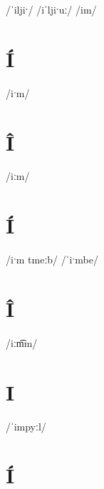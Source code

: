 \documentclass[10pt,a4paper,twoside]{book}
\begin{document}
\begin{multicols}{3}
 {/ˈiljiˑ/} {}
 {/iˈljiˑuː/} {}
 {/im/} {}
\end{multicols}

\section*{Í}

\begin{multicols}{3}
 {/iˑm/} {}
\end{multicols}

\section*{Î}

\begin{multicols}{3}
 {/iːm/} {}
\end{multicols}

\section*{Í}

\begin{multicols}{3}
 {/iˑm tmeːb/} {}
 {/ˈiˑmbe/} {}
\end{multicols}

\section*{Î}

\begin{multicols}{3}
 {/iːm͡m/} {}
\end{multicols}

\section*{I}

\begin{multicols}{3}
 {/ˈimpyːl/} {}
\end{multicols}

\section*{Í}
\end{document}
